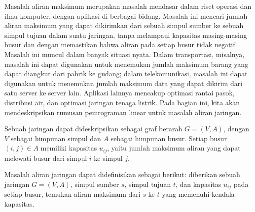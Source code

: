 Masalah aliran maksimum merupakan masalah mendasar dalam riset operasi dan ilmu komputer, dengan aplikasi di berbagai bidang. Masalah ini mencari jumlah aliran maksimum yang dapat dikirimkan dari sebuah simpul sumber ke sebuah simpul tujuan dalam suatu jaringan, tanpa melampaui kapasitas masing-masing busur dan dengan memastikan bahwa aliran pada setiap busur tidak negatif. Masalah ini muncul dalam banyak situasi nyata. Dalam transportasi, misalnya, masalah ini dapat digunakan untuk menemukan jumlah maksimum barang yang dapat diangkut dari pabrik ke gudang; dalam telekomunikasi, masalah ini dapat digunakan untuk menemukan jumlah maksimum data yang dapat dikirim dari satu server ke server lain. Aplikasi lainnya mencakup optimasi rantai pasok, distribusi air, dan optimasi jaringan tenaga listrik. Pada bagian ini, kita akan mendeskripsikan rumusan pemrograman linear untuk masalah aliran jaringan.

Sebuah jaringan dapat dideskripsikan sebagai graf berarah \( G = (V, A) \), dengan \( V \) sebagai himpunan simpul dan \( A \) sebagai himpunan busur. Setiap busur \( (i, j) \in A \) memiliki kapasitas \( u_{ij} \), yaitu jumlah maksimum aliran yang dapat melewati busur dari simpul \( i \) ke simpul \( j \).

Masalah aliran jaringan dapat didefinisikan sebagai berikut: diberikan sebuah jaringan \( G = (V, A) \), simpul sumber \( s \), simpul tujuan \( t \), dan kapasitas \( u_{ij} \) pada setiap busur, temukan aliran maksimum dari \( s \) ke \( t \) yang memenuhi kendala kapasitas.

